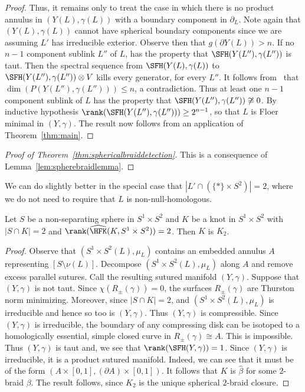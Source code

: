 \documentclass{amsart}
\theoremstyle{definition}
\theoremstyle{remark}
\numberwithin{equation}{section}
\begin{document}
\begin{proof}
  Thus, it remains only to treat the case in which there is no product annulus in $(Y(L),\gamma(L))$ with a boundary component in $\partial_L$. Note again that $(Y(L),\gamma(L))$ cannot have spherical boundary components since we are assuming $L'$ has irreducible exterior. Observe then that $g(\partial Y(L))> n$. If no $n-1$ component sublink $L''$ of $L$,  has the property that $\SFH(Y(L''),\gamma(L''))$ is taut. Then the spectral sequence from $\SFH(Y(L),\gamma(L))$ to $\SFH(Y(L''),\gamma(L''))\otimes V$ kills every generator, for every $L''$. It follows from~\cite[Corollary 5.27]{binns2024floer} that $\dim(P(Y(L''),\gamma(L'')))\leq n$, a contradiction. Thus at least one $n-1$ component sublink of $L$ has the property that $\SFH(Y(L''),\gamma(L''))\not\cong 0$. By inductive hypothesis $\rank(\SFH(Y(L''),\gamma(L'')))\geq 2^{n-1}$, so that $L$ is Floer minimal in $(Y,\gamma)$. The result now follows from an application of Theorem~\ref{thm:main}. \end{proof}



    \begin{proof}[Proof of Theorem~\ref{thm:sphericalbraiddetection}]
        This is a consequence of Lemma~\ref{lem:spherebraidlemma}.
    \end{proof}

    We can do slightly better in the special case that $|L'\cap(\{*\}\times S^2)|=2$, where we do not need to require that $L$ is non-null-homologous.
\begin{corollary}\label{prop:2int}
    Let $S$ be a non-separating sphere in $S^1\times S^2$ and $K$ be a knot in $S^1\times S^2$ with $|S\cap K|=2$ and $\rank(\widehat{\HFK}(K,S^1\times S^2))=2$. Then $K$ is $K_2$.
\end{corollary}

\begin{proof}
Observe that $(S^1\times S^2(L),\mu_L)$ contains an embedded annulus $A$ representing $[S\setminus \nu(L)]$. Decompose $(S^1\times S^2(L),\mu_L)$ along $A$ and remove excess parallel sutures. Call the resulting sutured manifold $(Y,\gamma)$. Suppose that $(Y,\gamma)$ is not taut. Since $\chi(R_\pm(\gamma))=0$, the surfaces $R_\pm(\gamma)$ are Thurston norm minimizing. Moreover, since $|S\cap K|=2$, and $(S^1\times S^2(L),\mu_L)$ is irreducible and hence so too is $(Y,\gamma)$. Thus $(Y,\gamma)$ is compressible. Since $(Y,\gamma)$ is irreducible, the boundary of any compressing disk can be isotoped to a homologically essential, simple closed curve in $R_\pm(\gamma)\cong A$. This is impossible. Thus $(Y,\gamma)$ is taut and, we see that $\rank(\SFH(Y,\gamma))=1$. Since $(Y,\gamma)$ is irreducible, it is a product sutured manifold. Indeed, we can see that it must be of the form $(A\times[0,1],(\partial A)\times[0,1])$. It follows that $K$ is $\widehat{\beta}$ for some $2$-braid $\beta$. The result follows, since $K_2$ is the unique spherical $2$-braid closure.
\end{proof}
\end{document}
